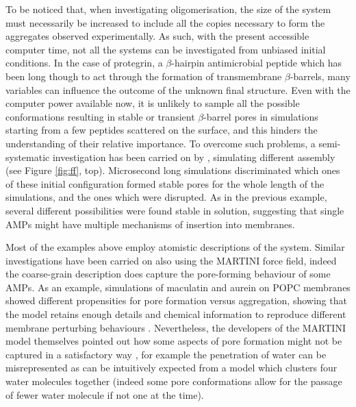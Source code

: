 To be noticed that, when investigating oligomerisation, the size of the system must necessarily be increased to include all the copies necessary to form the aggregates observed experimentally. As such, with the present accessible computer time, not all the systems can be investigated from unbiased initial conditions.
%
In the case of protegrin, a $\beta$-hairpin antimicrobial peptide which has been long though to act through the formation of transmembrane $\beta$-barrels, many variables can influence the outcome of the unknown final structure.
%
Even with the computer power available now, it is unlikely to sample all the possible conformations resulting in stable or transient $\beta$-barrel pores in simulations starting from a few peptides scattered on the surface, and this hinders the understanding of their relative importance.
%
To overcome such problems, a semi-systematic investigation has been carried on by \citet{Lipkin2017}, simulating different assembly (see Figure \ref{fig:ff}, top).
%
Microsecond long simulations discriminated which ones of these initial configuration formed stable pores for the whole length of the simulations, and the ones which were disrupted. As in the previous example, several different possibilities were found stable in solution, suggesting that single AMPs might have multiple mechanisms of insertion into membranes.

Most of the examples above employ atomistic descriptions of the system. Similar investigations have been carried on also using the MARTINI force field, indeed the coarse-grain description does capture the pore-forming behaviour of some AMPs.
%
As an example, simulations of maculatin and aurein on POPC membranes showed different propensities for pore formation versus aggregation, showing that the model retains enough details and chemical information to reproduce different membrane perturbing behaviours \citep{Balatti2017}.
%
Nevertheless, the developers of the MARTINI model themselves pointed out how some aspects of pore formation might not be captured in a satisfactory way \citep{Marrink2013}, for example the penetration of water can be misrepresented as can be intuitively expected from a model which clusters four water molecules together (indeed some pore conformations allow for the passage of fewer water molecule if not one at the time).

